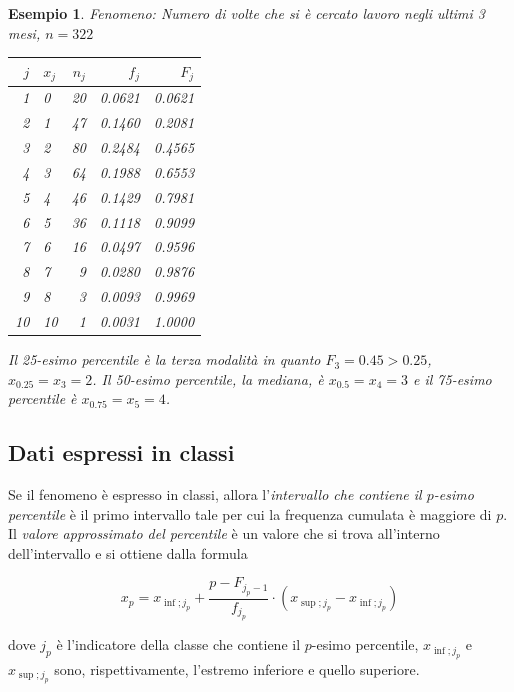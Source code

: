 \documentclass[
  11pt,
]{book}
\theoremstyle{mytheoremstyle}
\theoremstyle{mydefstyle}
\newtheorem{example}{{Esempio}}[section]
\begin{document}
\begin{example}
Fenomeno: Numero di volte che si è cercato lavoro negli ultimi 3 mesi, \(n=322\)

\begin{table}[H]
\centering
\begin{tabular}{|>{}r|lrrr}
\toprule
$j$ & $x_{j}$ & $n_j$ & $f_j$ & $F_j$\\
\midrule
1 & 0 & 20 & 0.0621 & 0.0621\\
2 & 1 & 47 & 0.1460 & 0.2081\\
3 & 2 & 80 & 0.2484 & 0.4565\\
4 & 3 & 64 & 0.1988 & 0.6553\\
5 & 4 & 46 & 0.1429 & 0.7981\\
6 & 5 & 36 & 0.1118 & 0.9099\\
7 & 6 & 16 & 0.0497 & 0.9596\\
8 & 7 & 9 & 0.0280 & 0.9876\\
9 & 8 & 3 & 0.0093 & 0.9969\\
10 & 10 & 1 & 0.0031 & 1.0000\\
\bottomrule
\end{tabular}
\end{table}

Il 25-esimo percentile è la terza modalità in quanto \(F_3=0.45>0.25\), \(x_{0.25}=x_3=2\). Il 50-esimo percentile, la mediana, è \(x_{0.5}=x_4=3\) e il 75-esimo percentile è \(x_{0.75}=x_5=4\).
\end{example}

\subsection{Dati espressi in classi}\label{dati-espressi-in-classi-1}

Se il fenomeno è espresso in classi, allora l'\emph{intervallo che contiene il \(p\)-esimo percentile} è il primo intervallo tale per cui la frequenza cumulata è maggiore di \(p\). Il \emph{valore approssimato del percentile} è un valore che si trova all'interno dell'intervallo e si ottiene dalla formula

\begin{info}
\[x_{p}=x_{\inf;j_p}+\frac{p-F_{j_p-1}}{f_{j_p}}\cdot \left(x_{\sup;j_p}-x_{\inf;j_p} \right)\]

\end{info}

dove \(j_p\) è l'indicatore della classe che contiene il \(p\)-esimo percentile, \(x_{\inf;j_p}\) e \(x_{\sup;j_p}\) sono, rispettivamente, l'estremo inferiore e quello superiore.
\end{document}
